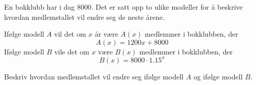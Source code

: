 \begin{figure}[H]
  \caption{}
  \label{fig:Forkurs-1p-2p-laererutdanning-2017-V-U-oppgave-1-4}
\end{figure}


\Oppgave[5]

En bokklubb har i dag $\num{8000}$. Det er satt opp to ulike modeller for å
beskrive hvordan medlemstallet vil endre seg de neste årene.

Ifølge modell $A$ vil det om $x$ år være $A(x)$ medlemmer i bokklubben, der
%
\begin{equation*}
  A(x) = \num{1200}x + \num{8000}
\end{equation*}
%
Ifølge modell $B$ vile det om $x$ være $B(x)$ medlemmer i bokklubben, der
%
\begin{equation*}
  B(x) = \num{8000} \cdot \num{1.15}^x
\end{equation*}
%
\begin{oppgaver}
   Beskriv hvordan medlemstallet vil endre seg ifølge modell $A$ og ifølge
  modell $B$.
\end{oppgaver}

